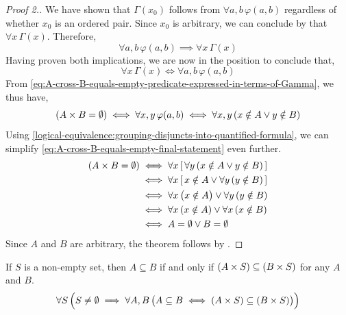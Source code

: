 \begin{proof}[Proof 2.]
    \vspace{0.5cm}
    \noindent
    We have shown that \( \Gamma(x_{0}) \) follows from \( \forall a,b \, \varphi(a,b) \) regardless
    of whether \( x_{0} \) is an ordered pair. Since \( x_{0} \) is arbitrary, we can conclude by  that
    \( \forall x \, \Gamma(x) \). Therefore,
    \begin{equation*}
        \forall a,b \, \varphi(a,b) \implies \forall x \, \Gamma(x)
    \end{equation*}
    Having proven both implications, we are now in the position to conclude that,
    \begin{equation*}
        \forall x \, \Gamma(x) \iff \forall a,b \, \varphi(a,b)
    \end{equation*}
    From \eqref{eq:A-cross-B-equals-empty-predicate-expressed-in-terms-of-Gamma}, we thus have,
    \begin{equation}
        \label{eq:A-cross-B-equals-empty-final-statement}
        \mleft( A \times B = \emptyset \mright) \iff \forall x,y \, \varphi(a,b) \iff \forall x,y \, \mleft( x \notin A \lor y \notin B \mright)
    \end{equation}
    Using \cref{logical-equivalence:grouping-disjuncts-into-quantified-formula}, we can simplify \eqref{eq:A-cross-B-equals-empty-final-statement}
    even further.
    \begin{align*}
        \mleft( A \times B = \emptyset \mright)
        &\iff
        \forall x \, \mleft[\, \forall y \, \mleft( x \notin A \lor y \notin B \mright) \,\mright] \\
        &\iff
        \forall x \, \mleft[\, x \notin A \lor \forall y \, \mleft( y \notin B \mright) \,\mright]\\
        &\iff
        \forall x \, \big( x \notin A \big) \lor \forall y \, \mleft( y \notin B \mright) \\
        &\iff
        \forall x \, \mleft( x \notin A \mright) \lor \forall x \, \mleft( x \notin B \mright) \\
        &\iff
        A = \emptyset \lor B = \emptyset
    \end{align*}
    Since \( A \) and \( B \) are arbitrary, the theorem follows by .
\end{proof}

\begin{thm}
    \label{thm:relationship-between-subset-and-cartesian-products}
    If \( S \) is a non-empty set, then \( A \subseteq B \) if and only if \( \mleft( A \times S \mright) \subseteq \mleft( B \times S \mright) \) for any \( A \) and \( B \).
    \begin{equation*}
        \forall S \, \Big( S \neq \emptyset \implies \forall A,B \, \big( A \subseteq B \iff \mleft( A \times S \mright) \subseteq \mleft( B \times S \mright)\big) \Big)
    \end{equation*}
\end{thm}

